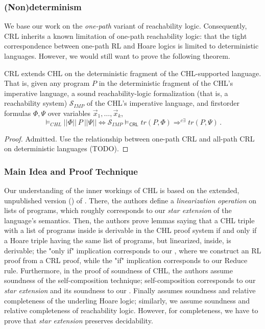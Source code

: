 \documentclass{article}
\newcommand{\CRL}{\mathsf{CRL}}
\begin{document}
\subsubsection{(Non)determinism}
We base our work on the \emph{one-path} variant of reachability logic.
Consequently, CRL inherits a known limitation of one-path reachability logic: that the tight correspondence between
one-path RL and Hoare logics is limited to deterministic languages.
However, we would still want to prove the following theorem.
\begin{theorem}
CRL extends CHL on the deterministic fragment of the CHL-supported language.
That is, given any program $P$ in the deterministic fragment of the CHL's imperative language,
a sound reachability-logic formalization (that is, a reachability system) $\mathcal{S}_{\mathit{IMP}}$ of the CHL's imperative language,
and firstorder formulas $\Phi, \Psi$ over variables $\vec{x}_1,\ldots,\vec{x}_k$,
\begin{equation*}
    \vDash_{\mathit{CHL}} ||\Phi||\ P\ ||\Psi||
    \iff
    \mathcal{S}_{\mathit{IMP}} \vDash_\CRL \mathit{tr}(P, \Phi) \Rightarrow^{c\exists} \mathit{tr}(P, \Psi) \, .
\end{equation*}
\end{theorem}
\begin{proof}
Admitted. Use the relationship between one-path CRL and all-path CRL on deterministic languages (TODO).
\end{proof}

\subsubsection{Main Idea and Proof Technique}

Our understanding of the inner workings of CHL is based on the extended, unpublished version (\cite{SousaD16Extended})
of \cite{SousaD16}.
There, the authors define a \emph{linearization operation} on lists of programs, which roughly corresponds to our
\emph{star extension} of the language's semantics.
Then, the authors prove lemmas saying that a CHL triple with a list of programs inside is derivable
in the CHL proof system
if and only if 
a Hoare triple having the same list of programs, but linearized, inside, is derivable;
the "only if" implication corresponds to our , where we construct
an RL proof from a CRL proof,
while the "if" implication corresponds to our Reduce rule.
Furthermore, in the proof of soundness of CHL, the authors assume soundness of the self-composition technique;
self-composition corresponds to our \emph{star extension} and its soundness to our .
Finally \cite{SousaD16Extended} assumes soundness and relative completeness of the underling Hoare logic;
similarly, we assume soundness and relative completeness of reachability logic.
However, for completeness, we have to prove that \emph{star extension} preserves decidability.
\end{document}
